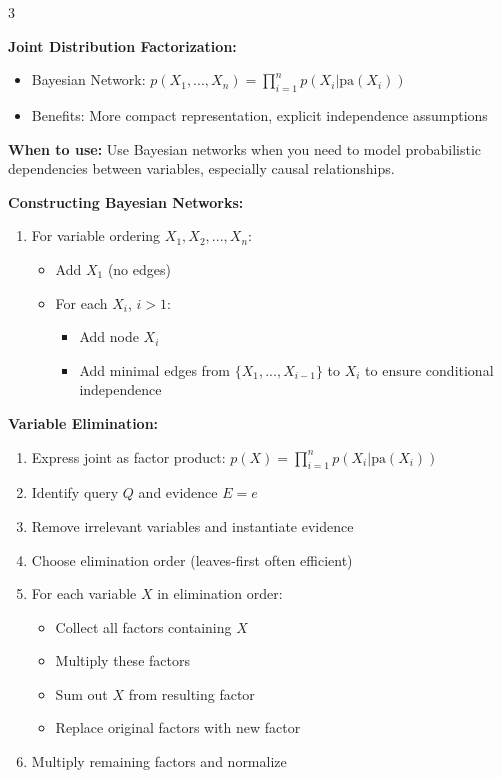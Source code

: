 \documentclass[10pt,landscape]{article}
\begin{document}
\begin{multicols}{3}
\begin{tcolorbox}[breakable, title=8. Graphical Models Concepts, colback=graphical]
\textbf{Joint Distribution Factorization:}
\begin{itemize}[leftmargin=*,noitemsep,topsep=0pt]
    \item Bayesian Network: $p(X_1, ..., X_n) = \prod_{i=1}^n p(X_i|\text{pa}(X_i))$
    \item Benefits: More compact representation, explicit independence assumptions
\end{itemize}
\end{tcolorbox}

\begin{tcolorbox}[breakable, title=8.1 Bayesian Networks and Inference, colback=graphical]
\textbf{When to use:} Use Bayesian networks when you need to model probabilistic dependencies between variables, especially causal relationships.

\textbf{Constructing Bayesian Networks:}
\begin{enumerate}[leftmargin=*,noitemsep,topsep=0pt]
    \item For variable ordering $X_1, X_2, ..., X_n$:
    \begin{itemize}[leftmargin=*,noitemsep]
        \item Add $X_1$ (no edges)
        \item For each $X_i$, $i > 1$:
        \begin{itemize}[leftmargin=*,noitemsep]
            \item Add node $X_i$
            \item Add minimal edges from $\{X_1,...,X_{i-1}\}$ to $X_i$ to ensure conditional independence
        \end{itemize}
    \end{itemize}
\end{enumerate}

\textbf{Variable Elimination:}
\begin{enumerate}[leftmargin=*,noitemsep,topsep=0pt]
    \item Express joint as factor product: $p(X) = \prod_{i=1}^n p(X_i|\text{pa}(X_i))$
    \item Identify query $Q$ and evidence $E=e$
    \item Remove irrelevant variables and instantiate evidence
    \item Choose elimination order (leaves-first often efficient)
    \item For each variable $X$ in elimination order:
    \begin{itemize}[leftmargin=*,noitemsep]
        \item Collect all factors containing $X$
        \item Multiply these factors
        \item Sum out $X$ from resulting factor
        \item Replace original factors with new factor
    \end{itemize}
    \item Multiply remaining factors and normalize
\end{enumerate}


\end{tcolorbox}
\end{multicols}
\end{document}
